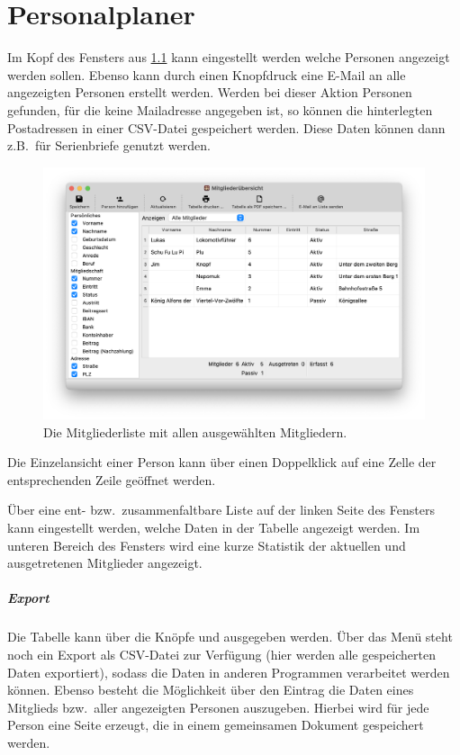 \chapter{Personalplaner}\label{personal:mitglieder}
Im Kopf des Fensters aus \cref{fig:personal:mitglieder} kann eingestellt werden welche Personen angezeigt werden sollen.
Ebenso kann durch einen Knopfdruck eine E-Mail an alle angezeigten Personen erstellt werden.
Werden bei dieser Aktion Personen gefunden, für die keine Mailadresse angegeben ist,
so können die hinterlegten Postadressen in einer CSV-Datei gespeichert werden.
Diese Daten können dann z.B.\ für Serienbriefe genutzt werden.


\begin{figure}[!h]
	\includegraphics[width=\textwidth]{img/personal-liste}
	\caption{Die Mitgliederliste mit allen ausgewählten Mitgliedern.}
	\label{fig:personal:mitglieder}
\end{figure}

Die Einzelansicht einer Person kann über einen Doppelklick auf eine Zelle der entsprechenden Zeile geöffnet werden.

Über eine ent- bzw.\ zusammenfaltbare Liste auf der linken Seite des Fensters kann eingestellt werden,
welche Daten in der Tabelle angezeigt werden.
Im unteren Bereich des Fensters wird eine kurze Statistik
der aktuellen und ausgetretenen Mitglieder angezeigt.

\paragraph{Export}
Die Tabelle kann über die Knöpfe  und  ausgegeben werden.
Über das Menü  steht noch ein Export als CSV-Datei zur Verfügung (hier werden alle gespeicherten Daten exportiert),
sodass die Daten in anderen Programmen verarbeitet werden können.
Ebenso besteht die Möglichkeit über den Eintrag  die Daten eines Mitglieds bzw.\ aller angezeigten Personen auszugeben.
Hierbei wird für jede Person eine Seite erzeugt, die in einem gemeinsamen Dokument gespeichert werden.


